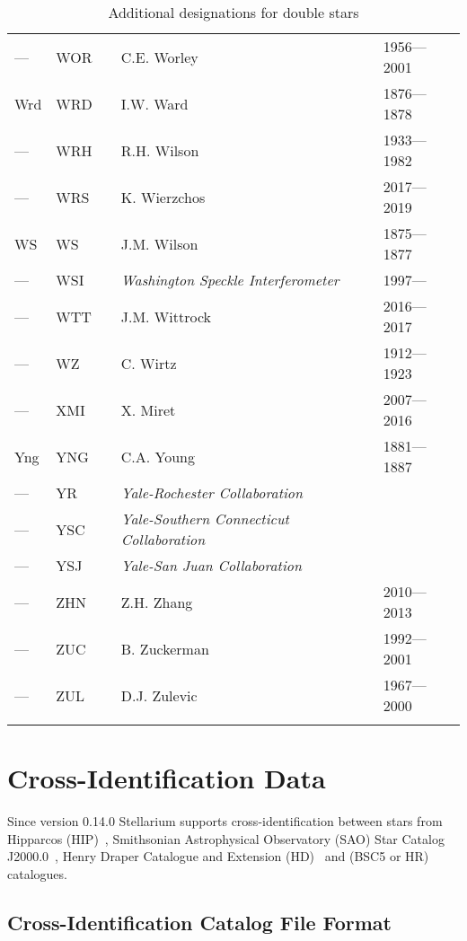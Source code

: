 \begin{longtable}{l|l|c|p{59mm}|l}
--- & WOR &   & C.E. Worley & 1956---2001 \\
Wrd & WRD &   & I.W. Ward & 1876---1878 \\
--- & WRH &   & R.H. Wilson & 1933---1982 \\
--- & WRS &   & K. Wierzchos & 2017---2019 \\
WS  & WS  &   & J.M. Wilson & 1875---1877 \\
--- & WSI &   & \emph{Washington Speckle Interferometer} & 1997--- \\
--- & WTT &   & J.M. Wittrock & 2016---2017 \\
--- & WZ  &   & C. Wirtz & 1912---1923 \\\midrule
--- & XMI &   & X. Miret & 2007---2016 \\\midrule
Yng & YNG &   & C.A. Young & 1881---1887 \\
--- & YR  &   & \emph{Yale-Rochester Collaboration} & \\
--- & YSC &   & \emph{Yale-Southern Connecticut  Collaboration} & \\
--- & YSJ  &   & \emph{Yale-San Juan Collaboration} & \\\midrule
--- & ZHN &   & Z.H. Zhang & 2010---2013 \\
---  & ZUC  &   & B. Zuckerman & 1992---2001 \\
---  & ZUL  &   & D.J. Zulevic & 1967---2000 \\\bottomrule
\caption{Additional designations for double stars}
\label{tab:StarCatalogues:DoubleStars:Designations}
\end{longtable}

\section{Cross-Identification Data}
\label{sec:StarCatalogues:CrossIdentificationData}

Since version 0.14.0 Stellarium supports cross-identification between stars from 
Hipparcos (HIP)~\citep{2012AstL...38..331A}, 
Smithsonian Astrophysical Observatory (SAO) Star Catalog J2000.0~\citep{1995yCat.1131....0S}, Henry Draper Catalogue and Extension (HD)~\citep{1993yCat.3135....0C} and 
  (BSC5 or HR) %
catalogues.

\subsection{Cross-Identification Catalog File Format}
\label{sec:StarCatalogues:CrossIdentificationData:format}

